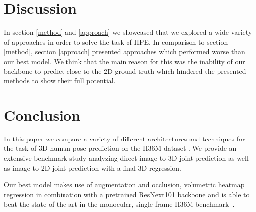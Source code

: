 \section{Discussion}
In section \ref{method} and \ref{approach} we showcased that we explored a wide variety of approaches in order to solve the task of HPE.
In comparison to section \ref{method}, section \ref{approach} presented approaches which performed worse than our best model.
We think that the main reason for this was the inability of our backbone to predict close to the 2D ground truth which hindered the presented methods to show their full potential.



\section{Conclusion}
In this paper we compare a variety of different architectures and techniques for the
task of 3D human pose prediction on the H36M dataset \cite{h36m_pami}.
We provide an extensive benchmark study analyzing direct image-to-3D-joint prediction
as well as image-to-2D-joint prediction with a final 3D regression.

Our best model makes use of augmentation and occlusion, volumetric heatmap regression in combination with
a pretrained ResNext101 backbone and is able to beat the state of the art in the monocular, single frame H36M benchmark~\cite{h36msinglecam, Li_2020_CVPR}. %



